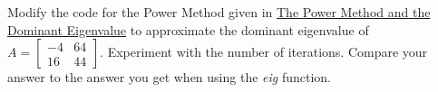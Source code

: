 \documentclass{ximera}
\begin{document}
\begin{problem}\label{prob_oct_eig4}
    Modify the code for the Power Method given in \href{https://ximera.osu.edu/linearalgebradzv3/LinearAlgebraInteractiveIntro/EIG-0070/main}{The Power Method and the Dominant Eigenvalue} to approximate the dominant eigenvalue of 
    $A=\begin{bmatrix}-4 & 64\\ 16 & 44\end{bmatrix}$.  Experiment with the number of iterations.  Compare your answer to the answer you get when using the \emph{eig} function.
\end{problem}
 
\end{document}
